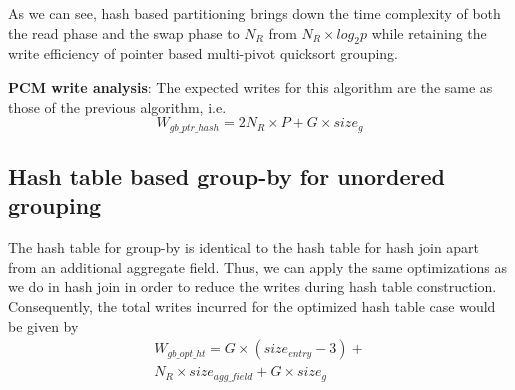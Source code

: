 As we can see, hash based partitioning brings down the time complexity of both the read phase and the swap phase to $N_R$ from $N_R \times log_2p$ while retaining the write efficiency of pointer based multi-pivot quicksort grouping. 


\textbf{PCM write analysis}: The expected writes for this algorithm are the same as those of the previous algorithm, i.e. 
\begin{equation}
\label{eq:gby_ptr_hash}
W_{gb\_ptr\_hash} = 2N_R \times P + G \times size_g
\end{equation}

\subsection{Hash table based group-by for unordered grouping}
The hash table for group-by is identical to the hash table for hash join apart from an additional aggregate field. Thus, we can apply the same optimizations as we do in hash join in order to reduce the writes during hash table construction. Consequently, the total writes incurred for the optimized hash table case would be given by
\begin{equation}
\begin{split}
W_{gb\_opt\_ht} = G \times (size_{entry} - 3) + \\
N_R \times size_{agg\_field} + G \times size_g
\end{split}
\end{equation}



